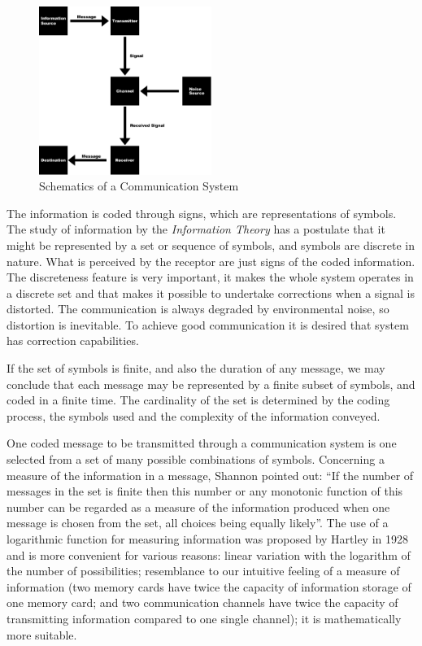\begin{figure}[htbp]
\centering
\includegraphics[width=0.5\textwidth]{images/communication_system.pdf}
\caption{Schematics of a Communication System}
\label{fig:communication_system}
\end{figure}  

The information is coded through signs, which are representations of symbols. The study of 
information by the \textit{Information Theory} has a postulate that it might be represented
by a set or sequence of symbols, and symbols are discrete in nature. What is perceived
by the receptor are just signs of the coded information. The discreteness feature is very important,
it makes the whole system operates in a discrete set 
and that makes it possible to undertake corrections 
when a signal is distorted. The communication is always degraded by environmental noise, so distortion 
is inevitable. To achieve good communication it is desired that system has correction capabilities.

If the set of symbols is finite, and also the duration of any message, we may conclude that each message may
be represented by a finite subset of symbols, and coded in a finite time. 
The cardinality of the set is determined
by the coding process, the symbols used and the complexity of the information conveyed.

One coded message to be transmitted through a communication system is one 
selected from a set of many possible combinations of symbols. 
Concerning a measure of the information in a message, 
Shannon pointed out: ``If the number of messages in the set is finite then this number or any monotonic function
of this number can be regarded as a measure of the information produced when one message is chosen from the set,
all choices being equally likely''\citep{shannon1948}. 
The use of a logarithmic function for measuring information
was proposed by Hartley \citep{hartley1928} in 1928 and is more convenient for various reasons: 
linear variation with the logarithm of the number of possibilities; 
resemblance to our intuitive feeling of a measure of information 
(two memory cards have twice the capacity of information storage of one memory card; and 
two communication channels have twice the capacity of transmitting information compared to one single channel); 
it is mathematically more suitable.

